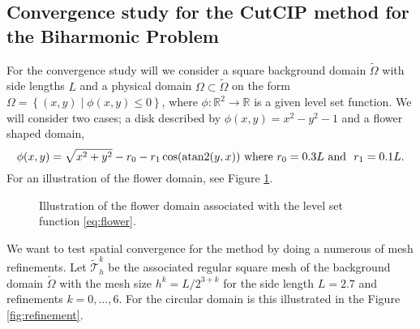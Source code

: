 \subsection{Convergence study for the CutCIP method for the Biharmonic Problem  }%
\label{sub:numerical_results_for_cutcip_biharmonic_equation}
For the convergence study will we consider a square background domain $\widetilde{\Omega} $ with side lengths $L$ and a physical domain $\Omega \subset \widetilde{\Omega}$ on the form $\Omega  = \left\{ ( x,y)  \mid \phi ( x,y) \le 0    \right\} $,
where $\phi: \mathbb{R} ^2 \to \mathbb{R}  $ is a given level set function. We will consider two cases; a disk described by $\phi( x,y) = x^{ 2} - y^{2} -1  $ and a flower shaped domain,
\begin{equation}
\label{eq:flower}
\phi ( x,y) =\sqrt{x^{2} + y^{2}} - r_{0} - r_{1}\cos(\operatorname{atan2}(y,x)) \text{ where }  r_{0} = 0.3L  \text{ and } \ r_{1} = 0.1L .
\end{equation}
For an illustration of the flower domain, see Figure \ref{fig:flower}.

\begin{figure}[h!]
    \centering
{}
\caption{Illustration of the flower domain associated with the level set function \eqref{eq:flower}.}
    \label{fig:flower}
\end{figure}


We want to test spatial convergence for the method by doing a numerous of mesh refinements. Let $ \widetilde{\mathcal{T}}_{h}^{k} $ be the associated regular square mesh of the background domain $\widetilde{\Omega }$ with the mesh size  $h^{k} = L/2^{3+k} $
for the side length $L=2.7$ and refinements
$k=0, \ldots, 6$. For the circular domain is this illustrated in the Figure \ref{fig:refinement}.

